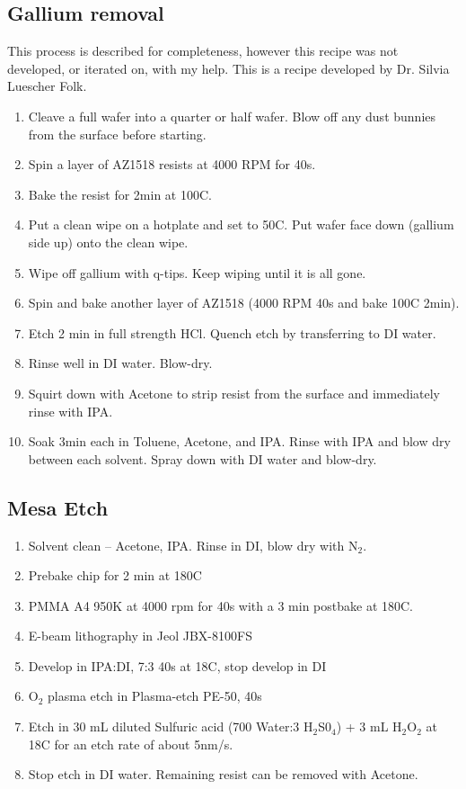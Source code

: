 \subsection{Gallium removal}
This process is described for completeness, however this recipe was not developed, or iterated on, with my help. This is a recipe developed by Dr. Silvia Luescher Folk.
\begin{enumerate}
	\item Cleave a full wafer into a quarter or half wafer. Blow off any dust bunnies from the surface before starting.
	\item Spin a layer of AZ1518 resists at 4000 RPM for 40s.
	\item Bake the resist for 2min at 100C.
	\item Put a clean wipe on a hotplate and set to 50C. Put wafer face down (gallium side up) onto the clean wipe.
	\item Wipe off gallium with q-tips. Keep wiping until it is all gone.
	\item Spin and bake another layer of AZ1518 (4000 RPM 40s and bake 100C 2min).
	\item Etch 2 min in full strength HCl. Quench etch by transferring to DI water.
	\item Rinse well in DI water. Blow-dry.
	\item Squirt down with Acetone to strip resist from the surface and immediately rinse with IPA.
	\item Soak 3min each in Toluene, Acetone, and IPA. Rinse with IPA and blow dry between each solvent. Spray down with DI water and blow-dry.
\end{enumerate}

\subsection{Mesa Etch}

\begin{enumerate}
	\item Solvent clean -- Acetone, IPA. Rinse in DI, blow dry with N$_2$.
	\item Prebake chip for 2 min at 180C
	\item PMMA A4 950K at 4000 rpm for 40s with a 3 min postbake at 180C.
    \item E-beam lithography in Jeol JBX-8100FS 
    \item Develop in IPA:DI, 7:3 40s at 18C, stop develop in DI
	\item O$_2$ plasma etch in Plasma-etch PE-50, 40s
	\item Etch in 30 mL diluted Sulfuric acid (700 Water:3 H$_2$S0$_4$) + 3 mL H$_2$O$_2$ at 18C for an etch rate of about 5nm/s.
	\item Stop etch in DI water. Remaining resist can be removed with Acetone.
\end{enumerate}

